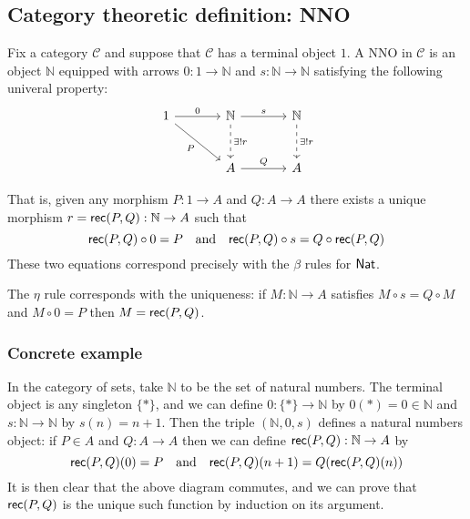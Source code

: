 \documentclass[12pt]{article}
\begin{document}
\subsection{Category theoretic definition: NNO}
Fix a category $\mathcal{C}$ and suppose that $\mathcal{C}$ has a terminal object $1$. A \acl{NNO} in $\mathcal{C}$ is an object $\mathbb{N}$ equipped with arrows $0 : 1 \to \mathbb{N}$ and $s : \mathbb{N} \to \mathbb{N}$ satisfying the following univeral property:
\[
\begin{tikzcd}[column sep=large,row sep=large]
1\rar{0}\drar[swap]{P} & \mathbb{N}\rar{s}\dar[dashed]{{\exists!}r} & \mathbb{N}\dar[dashed]{{\exists!}r}	\\
{} & A\rar{Q} & A
\end{tikzcd}
\]

That is, given any morphism $P : 1 \to A$ and $Q : A \to A$ there exists a unique morphism $r = \mathsf{rec}(P,Q) : \mathbb{N} \to A$ such that
\begin{equation*}
\mathsf{rec}(P,Q) \circ 0 = P \quad \text{and} \quad \mathsf{rec}(P,Q) \circ s = Q \circ \mathsf{rec}(P,Q)
\end{equation*}
These two equations correspond precisely with the $\beta$ rules for $\mathsf{Nat}$.

The $\eta$ rule corresponds with the uniqueness: if $M : \mathbb{N} \to A$ satisfies $M \circ s = Q \circ M$ and $M \circ 0 = P$ then $M = \mathsf{rec}(P,Q)$.

\subsubsection*{Concrete example} In the category of sets, take $\mathbb{N}$ to be the set of natural numbers. The terminal object is any singleton $\{ * \}$, and we can define $0 : \{ * \} \to \mathbb{N}$ by $0(*)=0 \in \mathbb{N}$ and $s : \mathbb{N} \to \mathbb{N}$ by $s(n)=n+1$. Then the triple $(\mathbb{N},0,s)$ defines a natural numbers object: if $P \in A$ and $Q : A \to A$ then we can define $\mathsf{rec}(P,Q) : \mathbb{N} \to A$ by
$$\mathsf{rec}(P,Q)(0) = P \quad \text{and} \quad \mathsf{rec}(P,Q)(n+1)=Q(\mathsf{rec}(P,Q)(n))$$
It is then clear that the above diagram commutes, and we can prove that $\mathsf{rec}(P,Q)$ is the unique such function by induction on its argument.
\end{document}
